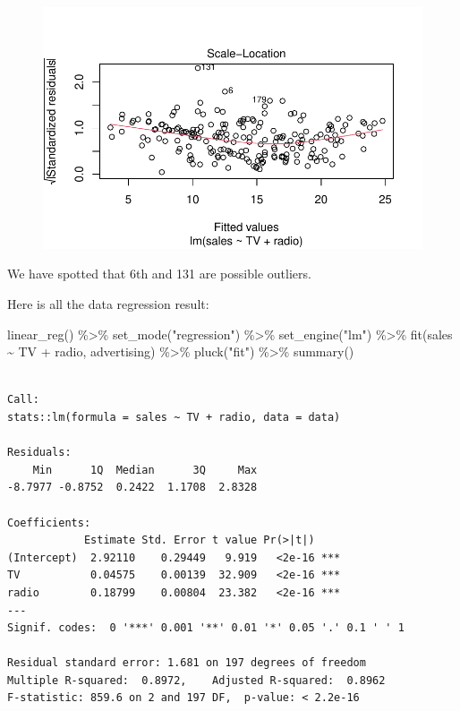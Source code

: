 \documentclass[
  letterpaper,
  DIV=11,
  numbers=noendperiod]{scrreprt}
\newenvironment{Shaded}{\begin{snugshade}}{\end{snugshade}}
\newcommand{\FunctionTok}[1]{\textcolor[rgb]{0.02,0.16,0.49}{#1}}
\newcommand{\NormalTok}[1]{\textcolor[rgb]{0.33,0.33,0.33}{#1}}
\newcommand{\SpecialCharTok}[1]{\textcolor[rgb]{0.00,0.46,0.62}{#1}}
\newcommand{\StringTok}[1]{\textcolor[rgb]{0.00,0.50,0.00}{#1}}
\begin{document}
\begin{figure}[H]

{\centering \includegraphics{Chapter3_files/figure-pdf/unnamed-chunk-97-1.pdf}

}

\end{figure}

We have spotted that 6th and 131 are possible outliers.

Here is all the data regression result:

\begin{Shaded}
\begin{Highlighting}[]
\FunctionTok{linear\_reg}\NormalTok{() }\SpecialCharTok{\%\textgreater{}\%} 
  \FunctionTok{set\_mode}\NormalTok{(}\StringTok{"regression"}\NormalTok{) }\SpecialCharTok{\%\textgreater{}\%} 
  \FunctionTok{set\_engine}\NormalTok{(}\StringTok{"lm"}\NormalTok{) }\SpecialCharTok{\%\textgreater{}\%} 
  \FunctionTok{fit}\NormalTok{(sales }\SpecialCharTok{\textasciitilde{}}\NormalTok{ TV }\SpecialCharTok{+}\NormalTok{ radio, advertising) }\SpecialCharTok{\%\textgreater{}\%} 
  \FunctionTok{pluck}\NormalTok{(}\StringTok{"fit"}\NormalTok{) }\SpecialCharTok{\%\textgreater{}\%} 
  \FunctionTok{summary}\NormalTok{()}
\end{Highlighting}
\end{Shaded}

\begin{verbatim}

Call:
stats::lm(formula = sales ~ TV + radio, data = data)

Residuals:
    Min      1Q  Median      3Q     Max 
-8.7977 -0.8752  0.2422  1.1708  2.8328 

Coefficients:
            Estimate Std. Error t value Pr(>|t|)    
(Intercept)  2.92110    0.29449   9.919   <2e-16 ***
TV           0.04575    0.00139  32.909   <2e-16 ***
radio        0.18799    0.00804  23.382   <2e-16 ***
---
Signif. codes:  0 '***' 0.001 '**' 0.01 '*' 0.05 '.' 0.1 ' ' 1

Residual standard error: 1.681 on 197 degrees of freedom
Multiple R-squared:  0.8972,    Adjusted R-squared:  0.8962 
F-statistic: 859.6 on 2 and 197 DF,  p-value: < 2.2e-16
\end{verbatim}
\end{document}
